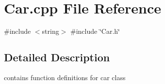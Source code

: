 \section{Car.\+cpp File Reference}
\label{_car_8cpp}
{\ttfamily \#include $<$string$>$}\newline
{\ttfamily \#include \char`\"{}Car.\+h\char`\"{}}\newline


\subsection{Detailed Description}
contains function definitions for car class 